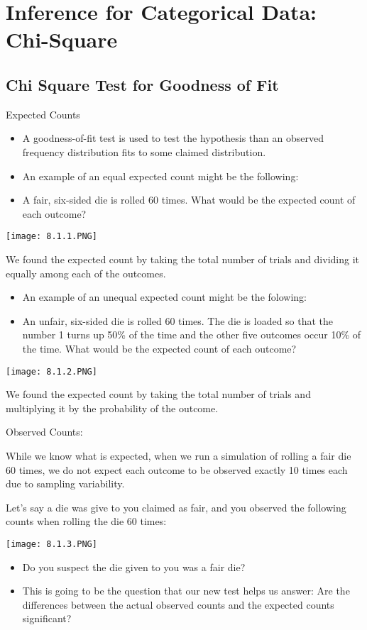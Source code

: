 \documentclass[../stats.tex]{subfiles}
\begin{document}
\chapter{Inference for Categorical Data: Chi-Square}
\section{Chi Square Test for Goodness of Fit}
Expected Counts 
\begin{itemize}
    \item A goodness-of-fit test is used to test the hypothesis than an observed frequency distribution fits to some claimed distribution.
    \item An example of an equal expected count might be the following:
    \item A fair, six-sided die is rolled 60 times. What would be the expected count of each outcome?
\end{itemize}
\begin{center}
    \texttt{[image: 8.1.1.PNG]}
\end{center}

We found the expected count by taking the total number of trials and dividing it equally among each of the outcomes.
\begin{itemize}
    \item An example of an unequal expected count might be the folowing:
    \item An unfair, six-sided die is rolled 60 times. The die is loaded so that the number 1 turns up 50\% of the time and the other five outcomes occur 10\% of the time. What would be the expected count of each outcome?
\end{itemize}
\begin{center}
    \texttt{[image: 8.1.2.PNG]}
\end{center}

We found the expected count by taking the total number of trials and multiplying it by the probability of the outcome.

Observed Counts:

While we know what is expected, when we run a simulation of rolling a fair die 60 times, we do not expect each outcome to be observed exactly 10 times each due to sampling variability.

Let's say a die was give to you claimed as fair, and you observed the following counts when rolling the die 60 times:
\begin{center}
    \texttt{[image: 8.1.3.PNG]}
\end{center}
\begin{itemize}
    \item Do you suspect the die given to you was a fair die?
    \item This is going to be the question that our new test helps us answer: Are the differences between the actual observed counts and the expected counts significant?
\end{itemize}
\end{document}

